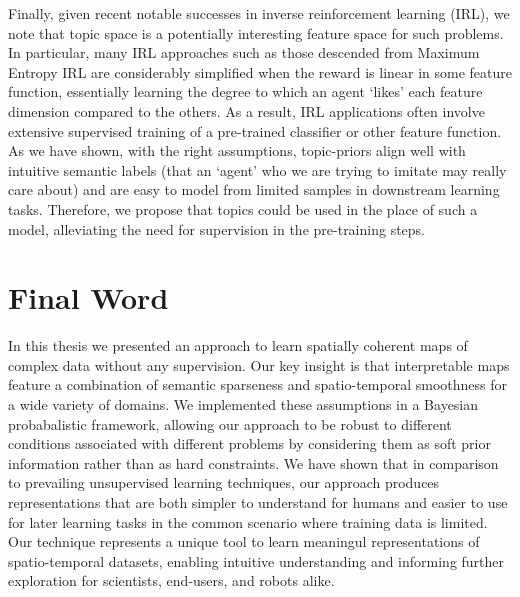 Finally, given recent notable successes in inverse reinforcement learning (IRL), we note that topic space is a potentially interesting feature space for such problems. In particular, many IRL approaches such as those descended from Maximum Entropy IRL \citep{ziebart2008maximum} are considerably simplified when the reward is linear in some feature function, essentially learning the degree to which an agent `likes' each feature dimension compared to the others. As a result, IRL applications often involve extensive supervised training of a pre-trained classifier or other feature function. As we have shown, with the right assumptions, topic-priors align well with intuitive semantic labels (that an `agent' who we are trying to imitate may really care about) and are easy to model from limited samples in downstream learning tasks. Therefore, we propose that topics could be used in the place of such a model, alleviating the need for supervision in the pre-training steps.

\section{Final Word}
In this thesis we presented an approach to learn spatially coherent maps of complex data without any supervision. Our key insight is that interpretable maps feature a combination of semantic sparseness and spatio-temporal smoothness for a wide variety of domains. We implemented these assumptions in a Bayesian probabalistic framework, allowing our approach to be robust to different conditions associated with different problems by considering them as soft prior information rather than as hard constraints. We have shown that in comparison to prevailing unsupervised learning techniques, our approach produces representations that are both simpler to understand for humans and easier to use for later learning tasks in the common scenario where training data is limited. Our technique represents a unique tool to learn meaningul representations of spatio-temporal datasets, enabling intuitive understanding and informing further exploration for scientists, end-users, and robots alike.


